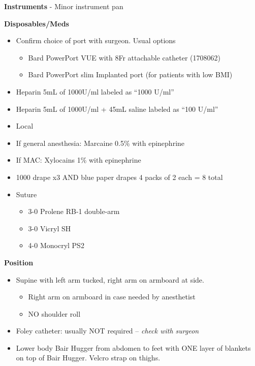 \documentclass[
  letterpaper,
]{scrbook}
\providecommand{\tightlist}{%
  \setlength{\itemsep}{0pt}\setlength{\parskip}{0pt}}
\begin{document}
\textbf{Instruments} - Minor instrument pan

\textbf{Disposables/Meds}

\begin{itemize}
\tightlist
\item
  Confirm choice of port with surgeon. Usual options

  \begin{itemize}
  \tightlist
  \item
    Bard PowerPort VUE with 8Fr attachable catheter (1708062)
  \item
    Bard PowerPort slim Implanted port (for patients with low BMI)
  \end{itemize}
\item
  Heparin 5mL of 1000U/ml labeled as ``1000 U/ml''
\item
  Heparin 5mL of 1000U/ml + 45mL saline labeled as ``100 U/ml''
\item
  Local
\item
  If general anesthesia: Marcaine 0.5\% with epinephrine
\item
  If MAC: Xylocains 1\% with epinephrine
\item
  1000 drape x3 AND blue paper drapes 4 packs of 2 each = 8 total
\item
  Suture

  \begin{itemize}
  \tightlist
  \item
    3-0 Prolene RB-1 double-arm
  \item
    3-0 Vicryl SH
  \item
    4-0 Monocryl PS2
  \end{itemize}
\end{itemize}

\textbf{Position}

\begin{itemize}
\tightlist
\item
  Supine with left arm tucked, right arm on armboard at side.

  \begin{itemize}
  \tightlist
  \item
    Right arm on armboard in case needed by anesthetist
  \item
    NO shoulder roll
  \end{itemize}
\item
  Foley catheter: usually NOT required -- \emph{check with surgeon}
\item
  Lower body Bair Hugger from abdomen to feet with ONE layer of blankets
  on top of Bair Hugger. Velcro strap on thighs.
\end{itemize}
\end{document}
